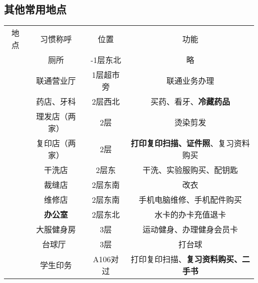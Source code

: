 \subsection[其他常用地点]{其他常用地点}
\label{common_locations}
\begin{table}[!ht]
    \vspace{-1em}
    \centering
    \begin{tabular}{|c|c|c|c|}
        \Xhline{1.2pt}
        地点                    & 习惯称呼               & 位置     & 功能                           \\
        \Xhline{1.2pt}
        \multirow{9}{*}{大服}   & 厕所                 & -1层东北  & 略                            \\
        \cline{2-4}
                              & 联通营业厅              & 1层超市旁  & 联通业务办理                       \\
        \cline{2-4}
                              & 药店、牙科              & 2层西北   & 买药、看牙、\textbf{冷藏药品}          \\
        \cline{2-4}
                              & 理发店（两家）            & 2层     & 烫染剪发                         \\
        \cline{2-4}
                              & 复印店（两家）            & 2层     & \textbf{打印复印扫描、证件照}、复习资料购买   \\
        \cline{2-4}
                              & 干洗店                & 2层东    & 干洗、实验服购买、配钥匙                 \\
        \cline{2-4}
                              & 裁缝店                & 2层东南   & 改衣                           \\
        \cline{2-4}
                              & 维修店                & 2层东南   & 手机电脑维修、手机配件购买                \\
        \cline{2-4}
                              & \textbf{办公室}       & 2层东北   & 水卡的办卡充值退卡                    \\
        \cline{2-4}
                              & 大服健身房\footnotemark & 3层     & 运动健身、办理健身会员卡                 \\
        \cline{2-4}
                              & 台球厅\               & 3层     & 打台球                          \\
        \Xhline{1.2pt}
        \multirow{3}{*}{中和广场} & 学生印务               & A106对过 & 打印复印扫描、\textbf{复习资料购买、二手书}   \\

\end{tabular}
\end{table}
